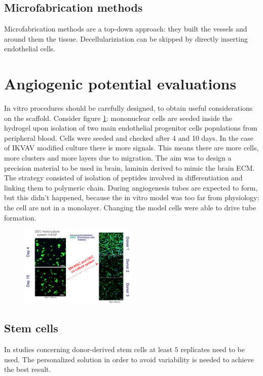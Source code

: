 	\subsection{Microfabrication methods}
	Microfabrication methods are a top-down approach: they built the vessels and around them the tissue.
	Decellulariziation can be skipped by directly inserting endothelial cells.

\section{Angiogenic potential evaluations}
In vitro procedures should be carefully designed, to obtain useful considerations on the scaffold.
Consider figure \ref{fig:coculture}: mononuclear cells are seeded inside the hydrogel upon isolation of two main endothelial progenitor cells populations from peripheral blood.
Cells were seeded and checked after 4 and 10 days.
In the case of IKVAV modified culture there is more signals.
This means there are more cells, more clusters and more layers due to migration.
The aim was to design a precision material to be used in brain, laminin derived to mimic the brain ECM.
The strategy consisted of isolation of peptides involved in differentiation and linking them to polymeric chain.
During angiogenesis tubes are expected to form, but this didn't happened, because the in vitro model was too far from physiology: the cell are not in a monolayer.
Changing the model cells were able to drive tube formation.

\begin{figure}[h]
	\centering
	\includegraphics[width=0.5\textwidth]{coculture}
	\caption{\label{fig:coculture}}
\end{figure}

	\subsection{Stem cells}
	In studies concerning donor-derived stem cells at least $5$ replicates need to be used.
	The personalized solution in order to avoid variability is needed to achieve the best result.

